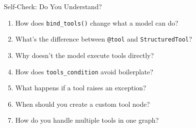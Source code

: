 \documentclass[aspectratio=169,11pt]{beamer}
\begin{document}
\begin{frame}{Self-Check: Do You Understand?}
  \begin{enumerate}
    \setlength{\itemsep}{1pt}
    \item How does \texttt{bind\_tools()} change what a model can do?
    \item What's the difference between \texttt{@tool} and \texttt{StructuredTool}?
    \item Why doesn't the model execute tools directly?
    \item How does \texttt{tools\_condition} avoid boilerplate?
    \item What happens if a tool raises an exception?
    \item When should you create a custom tool node?
    \item How do you handle multiple tools in one graph?
  \end{enumerate}
\end{frame}
\end{document}

